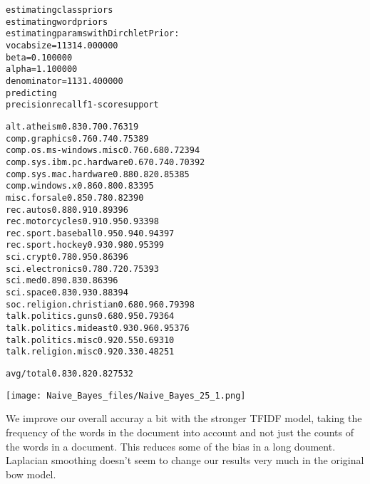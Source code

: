 \documentclass[letterpaper,10pt,english]{/usr/local/lib/python3.4/dist-packages/sphinx/texinputs/sphinxhowto}
\newenvironment{InvisibleVerbatim}
        {\begin{mdframed}[leftmargin=0.1\linewidth,innerleftmargin=3pt,innerrightmargin=3pt, userdefinedwidth=1\linewidth, linewidth=0pt, linecolor=white, usetwoside=false]}
        {\end{mdframed}}
\begin{document}
                \begin{InvisibleVerbatim}
                \vspace{-0.5\baselineskip}
\begin{alltt}estimating class priors
estimating word priors
estimating params with Dirchlet Prior:
         vocabsize = 11314.000000
         beta = 0.100000
         alpha = 1.100000
         denominator = 1131.400000
predicting
                          precision    recall  f1-score   support

             alt.atheism       0.83      0.70      0.76       319
           comp.graphics       0.76      0.74      0.75       389
 comp.os.ms-windows.misc       0.76      0.68      0.72       394
comp.sys.ibm.pc.hardware       0.67      0.74      0.70       392
   comp.sys.mac.hardware       0.88      0.82      0.85       385
          comp.windows.x       0.86      0.80      0.83       395
            misc.forsale       0.85      0.78      0.82       390
               rec.autos       0.88      0.91      0.89       396
         rec.motorcycles       0.91      0.95      0.93       398
      rec.sport.baseball       0.95      0.94      0.94       397
        rec.sport.hockey       0.93      0.98      0.95       399
               sci.crypt       0.78      0.95      0.86       396
         sci.electronics       0.78      0.72      0.75       393
                 sci.med       0.89      0.83      0.86       396
               sci.space       0.83      0.93      0.88       394
  soc.religion.christian       0.68      0.96      0.79       398
      talk.politics.guns       0.68      0.95      0.79       364
   talk.politics.mideast       0.93      0.96      0.95       376
      talk.politics.misc       0.92      0.55      0.69       310
      talk.religion.misc       0.92      0.33      0.48       251

             avg / total       0.83      0.82      0.82      7532

\end{alltt}

            \end{InvisibleVerbatim}
            
                \begin{InvisibleVerbatim}
                \vspace{-0.5\baselineskip}
    \begin{center}
    \texttt{[image: Naive\_Bayes\_files/Naive\_Bayes\_25\_1.png]}
    \par
    \end{center}
    
            \end{InvisibleVerbatim}
            
        
    
We improve our overall accuray a bit with the stronger TFIDF model,
taking the frequency of the words in the document into account and not
just the counts of the words in a document. This reduces some of the
bias in a long doument. Laplacian smoothing doesn't seem to change our
results very much in the original bow model.
        

        \renewcommand{\indexname}{Index}
        \printindex

    
\end{document}
